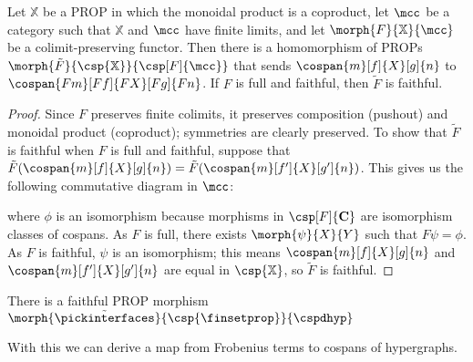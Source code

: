 \begin{theorem}
    \label{thm:cospan-homomorphism}
    Let \(\mathbb{X}\) be a PROP in which the monoidal product is a coproduct,
    let \(\mcc\) be a category such that \(\mathbb{X}\) and
    \(\mcc\) have finite limits, and let
    \(\morph{F}{\mathbb{X}}{\mcc}\) be a colimit-preserving functor.
    Then there is a homomorphism of PROPs \(
    \morph{\tilde{F}}{\csp{\mathbb{X}}}{\csp[F]{\mcc}}
    \) that sends \(\cospan{m}[f]{X}[g]{n}\) to
    \(\cospan{Fm}[Ff]{FX}[Fg]{Fn}\).
    If \(F\) is full and faithful, then \(\tilde{F}\) is faithful.
\end{theorem}
\begin{proof}
    Since \(F\) preserves finite colimits, it preserves composition (pushout)
    and monoidal product (coproduct); symmetries are clearly preserved.
    To show that \(\tilde{F}\) is faithful when \(F\) is full and faithful,
    suppose that \(
    \tilde{F}(\cospan{m}[f]{X}[g]{n})
    =
    \tilde{F}(\cospan{m}[f^\prime]{X}[g^\prime]{n})
    \).
    This gives us the following commutative diagram in \(\mcc\):

    \begin{center}
    \end{center}
    where \(\phi\) is an isomorphism because morphisms in
    \(\csp[F]{\mathbf{C}}\) are isomorphism classes of cospans.
    As \(F\) is full, there exists \(\morph{\psi}{X}{Y}\) such that
    \(F\psi = \phi\).
    As \(F\) is faithful, \(\psi\) is an isomorphism; this means
    \(\cospan{m}[f]{X}[g]{n}\) and \(\cospan{m}[f^\prime]{X}[g^\prime]{n}\) are
    equal in \(\csp{\mathbb{X}}\), so \(\tilde{F}\) is faithful.
\end{proof}

\begin{corollary}
    \label{cor:finset-to-hyp}
    There is a faithful PROP morphism
    \(\morph{\tilde{\pickinterfaces}}{\csp{\finsetprop}}{\cspdhyp}\)
\end{corollary}

With this we can derive a map from Frobenius terms to cospans of hypergraphs.

